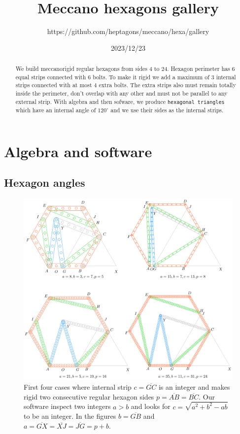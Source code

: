 \documentclass[11pt]{article}
\title{Meccano hexagons gallery}
\author{https://github.com/heptagons/meccano/hexa/gallery}
\date{2023/12/23}
\begin{document}
\maketitle
\begin{abstract}
We build meccano\meccanoref rigid regular hexagons from sides $4$ to $24$. Hexagon perimeter has $6$ equal strips connected with $6$ bolts. To make it rigid we add a maximum of $3$ internal strips connected with at most $4$ extra bolts. The extra strips also must remain totally inside the perimeter, don't overlap with any other and must not be parallel to any external strip. With algebra and then sofware, we produce \texttt{hexagonal triangles} which have an internal angle of $120^\circ$ and we use their sides as the internal strips.
\end{abstract}

\section{Algebra and software}

\subsection{Hexagon angles}

\begin{figure}[h]
\centering
\includegraphics[scale=0.9]{build/hexa-builder-a}
\caption{First four cases where internal strip $c = \overline{GC}$ is an integer and makes rigid two consecutive regular hexagon sides $p = \overline{AB} = \overline{BC}$. Our software inspect two integers $a > b$ and looks for $c = \sqrt{a^2+b^2-ab}$ to be an integer. In the figures $b = \overline{GB}$ and $a = \overline{GX} = \overline{XJ} = \overline{JG} = p + b$. }
\label{fig:builder-a}
\end{figure}
\end{document}
